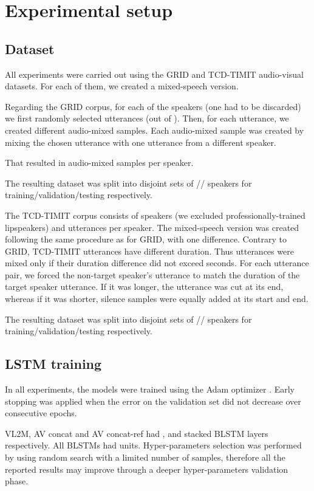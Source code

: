 \documentclass{article}
\begin{document}
\section{Experimental setup}
\subsection{Dataset}
All experiments were carried out using the GRID \cite{cooke_audio-visual_2006} and TCD-TIMIT \cite{harte_tcd-timit:_2015} audio-visual datasets. For each of them, we created a mixed-speech version. 

Regarding the GRID corpus, for each of the  speakers (one had to be discarded) we first randomly selected   utterances (out of ). Then, for each utterance, we created  different audio-mixed samples. Each audio-mixed sample was created by mixing the chosen utterance with one utterance from a different speaker. 

That resulted in  audio-mixed samples per speaker.

The resulting dataset was split into disjoint sets of // speakers for training/validation/testing respectively.

The TCD-TIMIT corpus consists of  speakers (we excluded  professionally-trained lipspeakers) and  utterances per speaker. The mixed-speech version was created following the same procedure as for GRID, with one difference. 
Contrary to GRID, TCD-TIMIT utterances have different duration. Thus  utterances were mixed only if their duration difference did not exceed  seconds. 
For each utterance pair, we forced the non-target speaker's utterance to match the duration of the target speaker utterance. If it was longer, the utterance was cut at its end, whereas if it was shorter, silence samples were equally added at its start and end.

The resulting dataset was split into disjoint sets of // speakers for training/validation/testing respectively.

\subsection{LSTM training}
In all experiments, the models were trained using the Adam optimizer \cite{adam}.
Early stopping was applied when the error on the validation set did not decrease over  consecutive epochs.

VL2M, AV concat and AV concat-ref had ,  and  stacked BLSTM layers respectively. All BLSTMs had  units. Hyper-parameters selection was performed by using random search with a limited number of samples, therefore all the reported results may improve through a deeper hyper-parameters validation phase.
\end{document}
